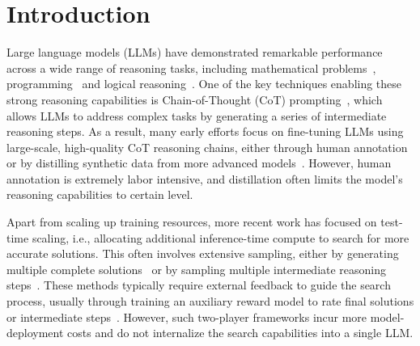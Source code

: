 \section{Introduction}
Large language models (LLMs) have demonstrated remarkable performance across a wide range of reasoning tasks, including mathematical problems~\cite{GSM8K, MATH}, programming~\cite{humaneval, bigcodebench} and logical reasoning~\cite{folio, logiqa}. One of the key techniques enabling these strong reasoning capabilities is Chain-of-Thought (CoT) prompting~\cite{wei2022chain}, which allows LLMs to address complex tasks by generating a series of intermediate reasoning steps. As a result, many early efforts focus on fine-tuning LLMs using large-scale, high-quality CoT reasoning chains, either through human annotation~\cite{MATH, mammoth} or by distilling synthetic data from more advanced models~\cite{metamath, openmathinstruct2, scalequest}. However, human annotation is extremely labor intensive, and distillation often limits the model's reasoning capabilities to certain level.

Apart from scaling up training resources, more recent work has focused on test-time scaling, i.e., allocating additional inference-time compute to search for more accurate solutions. This often involves extensive sampling, either by generating multiple complete solutions~\cite{wang2023selfconsistency} or by sampling multiple intermediate reasoning steps~\cite{yao2024tree, wan2024alphazero}. These methods typically require external feedback to guide the search process, usually through training an auxiliary reward model to rate final solutions or intermediate steps~\cite{easytohard, mathshepherd}. However, such two-player frameworks incur more model-deployment costs and do not internalize the search capabilities into a single LLM.

